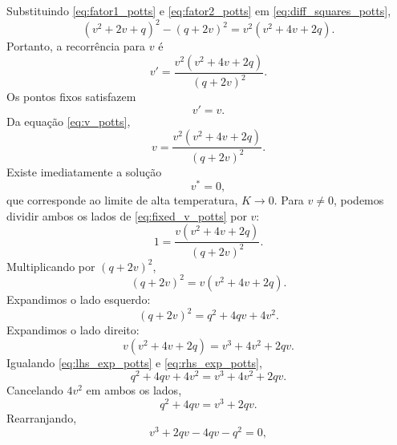 \documentclass[12pt,a4paper]{article}
\begin{document}
%
Substituindo \eqref{eq:fator1_potts} e \eqref{eq:fator2_potts} em
\eqref{eq:diff_squares_potts},
%
\begin{equation}
    (v^2+2v+q)^2-(q+2v)^2
    =
    v^2(v^2+4v+2q).
    \label{eq:num_factored_potts}
\end{equation}
%
Portanto, a recorrência para \(v\) é
%
\begin{equation}
    \boxed{
    v'
    =
    \frac{
        v^2(v^2+4v+2q)
    }{(q+2v)^2}.
    }
    \label{eq:v_potts}
\end{equation}
% 
Os pontos fixos satisfazem
%
\begin{equation}
    v'=v.
\end{equation}
%
Da equação \eqref{eq:v_potts},
%
\begin{equation}
    v
    =
    \frac{
        v^2(v^2+4v+2q)
    }{(q+2v)^2}.
    \label{eq:fixed_v_potts}
\end{equation}
%
Existe imediatamente a solução
%
\begin{equation}
    \boxed{
    v^*=0,
    }
    \label{eq:v0_potts}
\end{equation}
%
que corresponde ao limite de alta temperatura, \(K\to0\). Para \(v\neq0\), podemos dividir ambos os lados de \eqref{eq:fixed_v_potts}
por \(v\):
%
\begin{equation}
    1
    =
    \frac{
        v(v^2+4v+2q)
    }{(q+2v)^2}.
\end{equation}
%
Multiplicando por \((q+2v)^2\),
%
\begin{equation}
    (q+2v)^2
    =
    v(v^2+4v+2q).
    \label{eq:fixed_v2_potts}
\end{equation}
%
Expandimos o lado esquerdo:
%
\begin{equation}
    (q+2v)^2
    =
    q^2+4qv+4v^2.
    \label{eq:lhs_exp_potts}
\end{equation}
%
Expandimos o lado direito:
%
\begin{equation}
    v(v^2+4v+2q)
    =
    v^3+4v^2+2qv.
    \label{eq:rhs_exp_potts}
\end{equation}
%
Igualando \eqref{eq:lhs_exp_potts} e \eqref{eq:rhs_exp_potts},
%
\begin{equation}
    q^2+4qv+4v^2
    =
    v^3+4v^2+2qv.
\end{equation}
%
Cancelando \(4v^2\) em ambos os lados,
%
\begin{equation}
    q^2+4qv
    =
    v^3+2qv.
\end{equation}
%
Rearranjando,
%
\begin{equation}
    v^3+2qv-4qv-q^2=0,
\end{equation}
\end{document}
